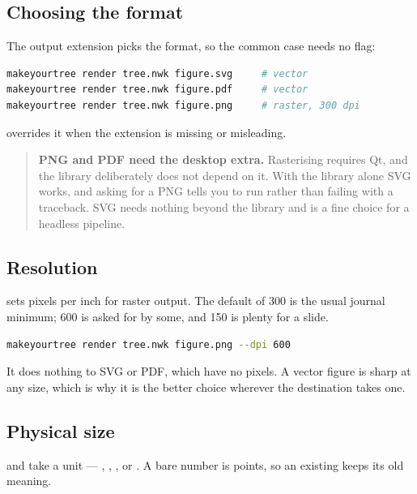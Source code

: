 \subsection{Choosing the format}

The output extension picks the format, so the common case needs no flag:

\begin{lstlisting}[language=bash]
makeyourtree render tree.nwk figure.svg     # vector
makeyourtree render tree.nwk figure.pdf     # vector
makeyourtree render tree.nwk figure.png     # raster, 300 dpi
\end{lstlisting}

 overrides it when the extension is missing or misleading.

\begin{quote}
\textbf{PNG and PDF need the desktop extra.} Rasterising requires Qt, and the
 library deliberately does not depend on it. With the library
alone SVG works, and asking for a PNG tells you to run
 rather than failing with a traceback.
SVG needs nothing beyond the library and is a fine choice for a headless
pipeline.
\end{quote}

\subsection{Resolution}

 sets pixels per inch for raster output. The default of 300 is the
usual journal minimum; 600 is asked for by some, and 150 is plenty for a slide.

\begin{lstlisting}[language=bash]
makeyourtree render tree.nwk figure.png --dpi 600
\end{lstlisting}

It does nothing to SVG or PDF, which have no pixels. A vector figure is sharp at
any size, which is why it is the better choice wherever the destination takes
one.

\subsection{Physical size}

 and  take a unit --- , , ,
 or . A bare number is points, so an existing
 keeps its old meaning.


